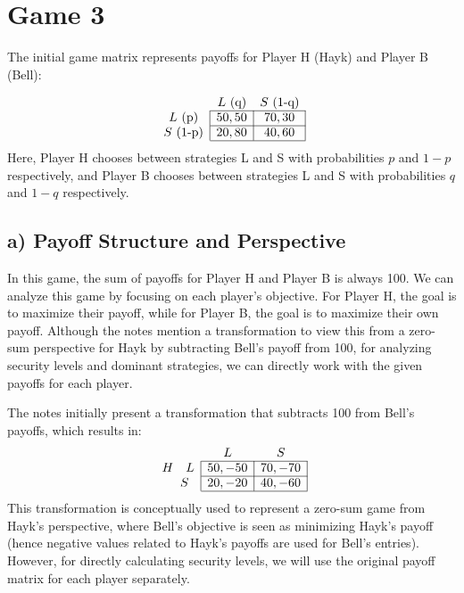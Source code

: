 \documentclass{article}
\begin{document}
\sloppy

\section*{Game 3}

The initial game matrix represents payoffs for Player H (Hayk) and Player B (Bell):

\[
\begin{array}{c|c|c|}
\multicolumn{1}{c}{} & \multicolumn{1}{c}{L \text{ (q)}} & \multicolumn{1}{c}{S \text{ (1-q)}} \\ \cline{2-3}
L \text{ (p)} & 50, 50 & 70, 30 \\ \cline{2-3}
S \text{ (1-p)} & 20, 80 & 40, 60 \\ \cline{2-3}
\end{array}
\]
Here, Player H chooses between strategies L and S with probabilities $p$ and $1-p$ respectively, and Player B chooses between strategies L and S with probabilities $q$ and $1-q$ respectively.

\subsection*{a) Payoff Structure and Perspective}
In this game, the sum of payoffs for Player H and Player B is always 100. We can analyze this game by focusing on each player's objective.  For Player H, the goal is to maximize their payoff, while for Player B, the goal is to maximize their own payoff.  Although the notes mention a transformation to view this from a zero-sum perspective for Hayk by subtracting Bell's payoff from 100, for analyzing security levels and dominant strategies, we can directly work with the given payoffs for each player.

The notes initially present a transformation that subtracts 100 from Bell's payoffs, which results in:
\[
\begin{array}{c|c|c|}
\multicolumn{1}{c}{} & \multicolumn{1}{c}{L} & \multicolumn{1}{c}{S} \\ \cline{2-3}
H \quad L & 50, -50 & 70, -70 \\ \cline{2-3}
\quad S & 20, -20 & 40, -60 \\ \cline{2-3}
\end{array}
\]
This transformation is conceptually used to represent a zero-sum game from Hayk's perspective, where Bell's objective is seen as minimizing Hayk's payoff (hence negative values related to Hayk's payoffs are used for Bell's entries). However, for directly calculating security levels, we will use the original payoff matrix for each player separately.
\end{document}
